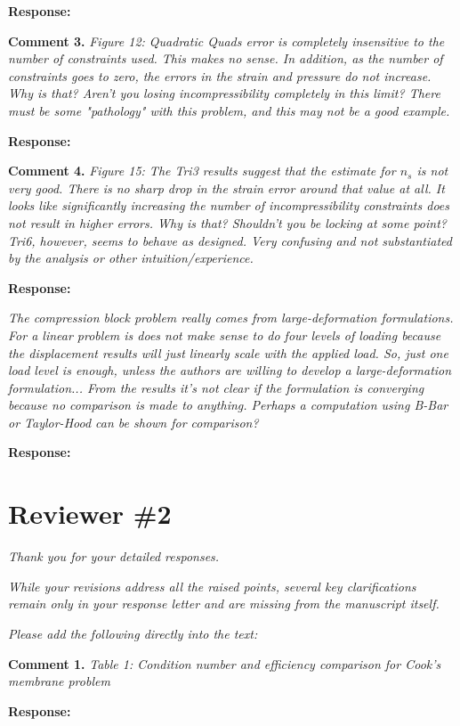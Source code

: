 \documentclass{article}
\begin{document}
\textbf{Response:}

\textbf{Comment 3.} \textit{Figure 12: Quadratic Quads error is completely insensitive to the number of constraints used. This makes no sense. In addition, as the number of constraints goes to zero, the errors in the strain and pressure do not increase. Why is that? Aren't you losing incompressibility completely in this limit? There must be some "pathology" with this problem, and this may not be a good example.}

\textbf{Response:} 

\textbf{Comment 4.} \textit{
Figure 15:
The Tri3 results suggest that the estimate for $n_s$ is not very good. There is no sharp drop in the strain error around that value at all.
It looks like significantly increasing the number of incompressibility constraints does not result in higher errors.
Why is that? Shouldn't you be locking at some point? Tri6, however, seems to behave as designed. Very confusing and not substantiated by the analysis or other intuition/experience.
}

\textbf{Response:}

\textit{The compression block problem really comes from large-deformation formulations. For a linear problem is does not make sense to do four levels of loading because the displacement results will just linearly scale with the applied load. So, just one load level is enough, unless the authors are willing to develop a large-deformation formulation... From the results it's not clear if the formulation is converging because no comparison is made to anything. Perhaps a computation using B-Bar or Taylor-Hood can be shown for comparison?}

\textbf{Response:} 

\section*{Reviewer \#2}

\textit{Thank you for your detailed responses.}

\textit{While your revisions address all the raised points, several key clarifications remain only in your response letter and are missing from the manuscript itself.}

\textit{Please add the following directly into the text:}

\textbf{Comment 1.} \textit{ Table 1: Condition number and eﬀiciency comparison for Cook's membrane problem}

\textbf{Response:}
\end{document}
